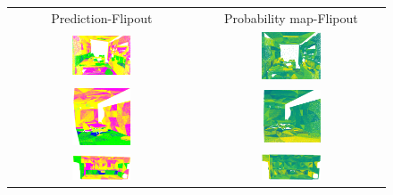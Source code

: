     \begin{figure}[h!]
        \centering
        \begin{tabular}{cc}
            Prediction-Flipout & Probability map-Flipout \\
            \includegraphics[width=0.33\textwidth, height=0.18\textheight]{images/seg_output/s3dis_DE/office_3.pdf}& 
            \includegraphics[width=0.33\textwidth, height=0.18\textheight]{images/seg_output/s3dis_DE/fout_1.pdf}\\

            \includegraphics[width=0.33\textwidth, height=0.18\textheight]{images/seg_output/s3dis_DE/ocroom_1.pdf}& 
            \includegraphics[width=0.33\textwidth, height=0.18\textheight]{images/seg_output/s3dis_DE/fout_2.pdf}\\

            \includegraphics[width=0.33\textwidth, height=0.18\textheight]{images/seg_output/s3dis_DE/opantry_1.pdf}& 
            \includegraphics[width=0.33\textwidth, height=0.18\textheight]{images/seg_output/s3dis_DE/fout_3.pdf}\\


\end{tabular}
\end{figure}
